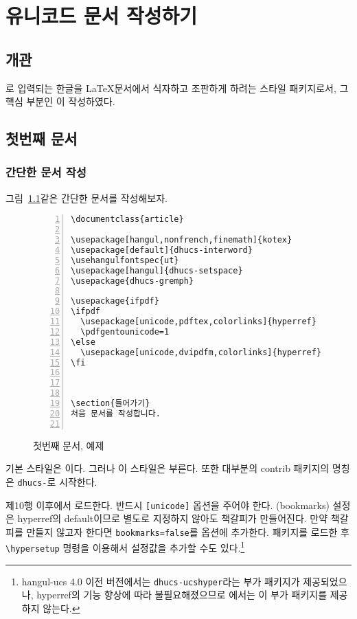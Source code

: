\chapter{유니코드 문서 작성하기}

\section{개관}

\thispkg\는  로 입력되는 한글을 \LaTeX 문서에서
식자하고 조판하게 하려는 스타일 패키지로서, 그 핵심 부분인 \를
이 작성하였다.

\section{첫번째 문서}
\subsection{간단한 문서 작성}
그림~\ref{fig:firstdoc}\과 같은 간단한 문서를 작성해보자.
\begin{figure}[tbp]
\begin{Verbatim}[fontsize=\small,numbers=left]
\documentclass{article}

\usepackage[hangul,nonfrench,finemath]{kotex}
\usepackage[default]{dhucs-interword}
\usehangulfontspec{ut}
\usepackage[hangul]{dhucs-setspace}
\usepackage{dhucs-gremph}

\usepackage{ifpdf}
\ifpdf
  \usepackage[unicode,pdftex,colorlinks]{hyperref}
  \pdfgentounicode=1
\else
  \usepackage[unicode,dvipdfm,colorlinks]{hyperref}
\fi



\section{들어가기}
처음 문서를 작성합니다.


\end{Verbatim}
\caption{첫번째 문서, 예제}\label{fig:firstdoc}
\end{figure}

 기본 스타일은 이다. 그러나 이 스타일은
\를 부른다. 또한 대부분의 contrib 패키지의 명칭은
\texttt{dhucs-}로 시작한다. 

제10행 이후에서 \을 로드한다. 반드시
\verb|[unicode]| 옵션을 주어야 한다. 
(bookmarks)
설정은 hyperref의 default이므로 별도로 지정하지 않아도
책갈피가 만들어진다. 만약 책갈피를 만들지 않고자 한다면
\verb|bookmarks=false|를 옵션에 추가한다.
패키지를 로드한 후 \verb|\hypersetup| 명령을
이용해서 설정값을 추가할 수도 있다.\footnote{%
  hangul-ucs 4.0 이전 버전에서는 \texttt{dhucs-ucshyper}라는 
  부가 패키지가 제공되었으나, hyperref의 기능 향상에
  따라 불필요해졌으므로 \kotex 에서는 이 부가 패키지를 제공하지
  않는다.}


